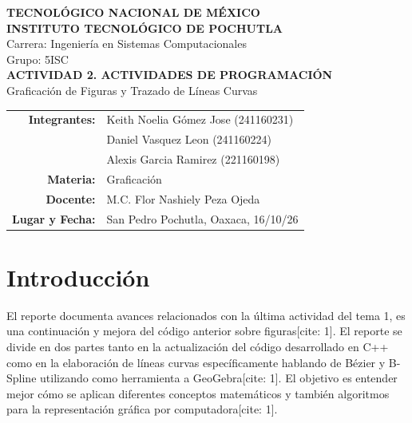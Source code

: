 \documentclass[12pt,letterpaper]{article}
\begin{document}
\begin{center}
    {\Large \textbf{TECNOLÓGICO NACIONAL DE MÉXICO}} \\[0.3cm]
    {\Large \textbf{INSTITUTO TECNOLÓGICO DE POCHUTLA}} \\[0.3cm]
    {\large Carrera: Ingeniería en Sistemas Computacionales} \\[0.2cm]
    {\normalsize Grupo: 5ISC} \\[1.5cm]
    
    {\LARGE \textbf{ACTIVIDAD 2. ACTIVIDADES DE PROGRAMACIÓN}} \\[0.5cm]
    {\large Graficación de Figuras y Trazado de Líneas Curvas} \\[2cm]
    
    \begin{tabular}{rl}
        \textbf{Integrantes:} & Keith Noelia Gómez Jose (241160231) \\
                              & Daniel Vasquez Leon (241160224) \\
                              & Alexis Garcia Ramirez (221160198) \\
        \textbf{Materia:} & Graficación \\
        \textbf{Docente:} & M.C. Flor Nashiely Peza Ojeda \\
        \textbf{Lugar y Fecha:} & San Pedro Pochutla, Oaxaca, 16/10/26 \\
    \end{tabular}
\end{center}

\thispagestyle{empty}
\newpage

\tableofcontents
\newpage

\section{Introducción}
\label{sec:introduccion}

El reporte documenta avances relacionados con la última actividad del tema 1, es una continuación y mejora del código anterior sobre figuras[cite: 1]. El reporte se divide en dos partes tanto en la actualización del código desarrollado en C++ como en la elaboración de líneas curvas específicamente hablando de Bézier y B-Spline utilizando como herramienta a GeoGebra[cite: 1]. El objetivo es entender mejor cómo se aplican diferentes conceptos matemáticos y también algoritmos para la representación gráfica por computadora[cite: 1].
\end{document}
